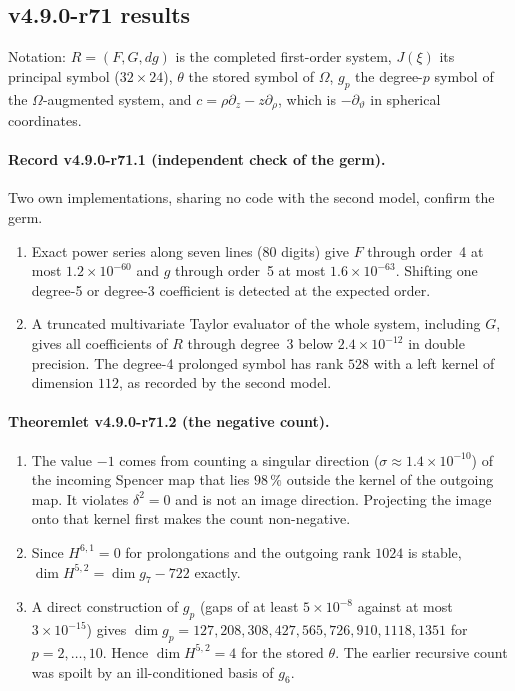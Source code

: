 \subsection*{v4.9.0-r71 results}
\label{subsec:v490-r71-results}

Notation: \(R=(F,G,dg)\) is the completed first-order system, \(J(\xi)\) its principal symbol (\(32\times24\)), \(\theta\) the
stored symbol of \(\Omega\), \(g_p\) the degree-\(p\) symbol of the \(\Omega\)-augmented system, and
\(c=\rho\partial_z-z\partial_\rho\), which is \(-\partial_\vartheta\) in spherical coordinates.

\paragraph{Record v4.9.0-r71.1 (independent check of the germ).}
Two own implementations, sharing no code with the second model, confirm the germ.
\begin{enumerate}[leftmargin=2em]
\item[(a)] Exact power series along seven lines (80 digits) give \(F\) through order~4 at most \(1.2\times10^{-60}\) and \(g\)
through order~5 at most \(1.6\times10^{-63}\).  Shifting one degree-5 or degree-3 coefficient is detected at the expected order.
\item[(b)] A truncated multivariate Taylor evaluator of the whole system, including \(G\), gives all coefficients of \(R\)
through degree~3 below \(2.4\times10^{-12}\) in double precision.  The degree-4 prolonged symbol has rank \(528\) with a left
kernel of dimension \(112\), as recorded by the second model.
\end{enumerate}

\paragraph{Theoremlet v4.9.0-r71.2 (the negative count).}
\begin{enumerate}[leftmargin=2em]
\item[(a)] The value \(-1\) comes from counting a singular direction (\(\sigma\approx1.4\times10^{-10}\)) of the incoming Spencer map
that lies \(98\,\%\) outside the kernel of the outgoing map.  It violates \(\delta^2=0\) and is not an image direction.
Projecting the image onto that kernel first makes the count non-negative.
\item[(b)] Since \(H^{6,1}=0\) for prolongations and the outgoing rank \(1024\) is stable,
\(\dim H^{5,2}=\dim g_7-722\) exactly.
\item[(c)] A direct construction of \(g_p\) (gaps of at least \(5\times10^{-8}\) against at most \(3\times10^{-15}\)) gives
\(\dim g_p=127,208,308,427,565,726,910,1118,1351\) for \(p=2,\dots,10\).  Hence \(\dim H^{5,2}=4\) for the stored \(\theta\).
The earlier recursive count was spoilt by an ill-conditioned basis of \(g_6\).
\end{enumerate}


